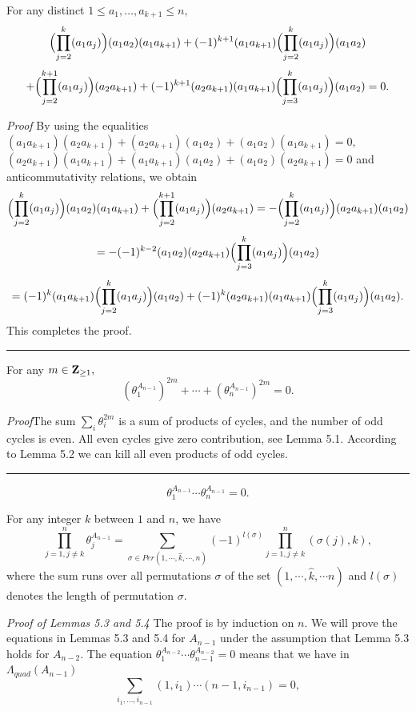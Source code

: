 \begin{lem}
For any distinct $1\leq a_1,\ldots,a_{k+1} \leq n,$ 
\[ \Bigl( \prod_{j=2}^k (a_1a_j) \Bigr) (a_1a_2)(a_1a_{k+1}) + 
(-1)^{k+1} (a_1a_{k+1}) 
\Bigl( \prod_{j=2}^k (a_1a_j) \Bigr) (a_1a_2) \] 
\[ +\Bigl( \prod_{j=2}^{k+1} (a_1a_j) \Bigr) (a_2a_{k+1})+ 
(-1)^{k+1}(a_2a_{k+1})(a_1a_{k+1})
\Bigl( \prod_{j=3}^k (a_1a_j) \Bigr) (a_1a_2) =0. \]
\end{lem}
{\it Proof} \quad By using the equalities 
$(a_1a_{k+1})(a_2a_{k+1})+(a_2a_{k+1})(a_1a_2)+
(a_1a_2)(a_1a_{k+1})=0,$ 
$(a_2a_{k+1})(a_1a_{k+1})+(a_1a_{k+1})(a_1a_2)+
(a_1a_2)(a_2a_{k+1})=0$ 
and anticommutativity relations, we obtain 
\[ \Bigl( \prod_{j=2}^k (a_1a_j) \Bigr) (a_1a_2)(a_1a_{k+1})+
\Bigl( \prod_{j=2}^{k+1} (a_1a_j) \Bigr) (a_2a_{k+1}) = -
\Bigl( \prod_{j=2}^k (a_1a_j) \Bigr) (a_2a_{k+1})(a_1a_2)  \]
\[ =  -(-1)^{k-2}(a_1a_2)(a_2a_{k+1})
\Bigl( \prod_{j=3}^k (a_1a_j) \Bigr) (a_1a_2)  \] 
\[ =  (-1)^k (a_1a_{k+1}) 
\Bigl( \prod_{j=2}^k (a_1a_j) \Bigr) (a_1a_2) + 
(-1)^k (a_2a_{k+1})(a_1a_{k+1})
\Bigl( \prod_{j=3}^k (a_1a_j) \Bigr) (a_1a_2).  \]
This completes the proof. \quad \rule{3mm}{3mm} 
\begin{cor}
For any $m\in {\bf Z}_{\geq 1},$ 
\[ (\theta_1^{A_{n-1}})^{2m}+\cdots +(\theta_n^{A_{n-1}})^{2m}=
0. \]
\end{cor}
{\it Proof}\quad The sum $\sum_i \theta_i^{2m}$ is a 
sum of products of cycles, and the number of odd cycles is even. 
All even cycles give zero contribution, see Lemma 5.1. 
According to Lemma 5.2 we can kill all even products of 
odd cycles. \quad \rule{3mm}{3mm}
\begin{lem} 
\abovedisplayskip -2mm 
\[ \theta_1^{A_{n-1}}\cdots \theta_n^{A_{n-1}} =0. \] 
\end{lem}
\begin{lem} For any integer $k$ between $1$ and $n$, we have
$$  \prod_{j=1, j \ne k}^{n} \theta_j^{A_{n-1}}= \sum_{\sigma 
\in Per(1,\cdots,\widehat k,\cdots,n)} 
(-1)^{l(\sigma)}\prod_{j=1, j \ne k}^{n}(\sigma(j),k),$$
where the sum runs over all permutations $\sigma$ of the set $(1,\cdots,
\widehat k,\cdots n)$ and $l(\sigma)$ denotes the length of permutation $\sigma.$
\end{lem}
{\it Proof of Lemmas 5.3 and 5.4} \quad The proof is by induction 
on $n.$ We will prove the equations in Lemmas 5.3 and 5.4 for $A_{n-1}$ 
under the assumption that Lemma 5.3 holds for $A_{n-2}.$ The equation 
$\theta_1^{A_{n-2}}\cdots \theta_{n-1}^{A_{n-2}} =0$ means that we have in 
$\Lambda_{quad}(A_{n-1})$ 
\[ \sum_{i_1,\ldots ,i_{n-1}} (1,i_1)\cdots (n-1,i_{n-1}) =0, \] 
